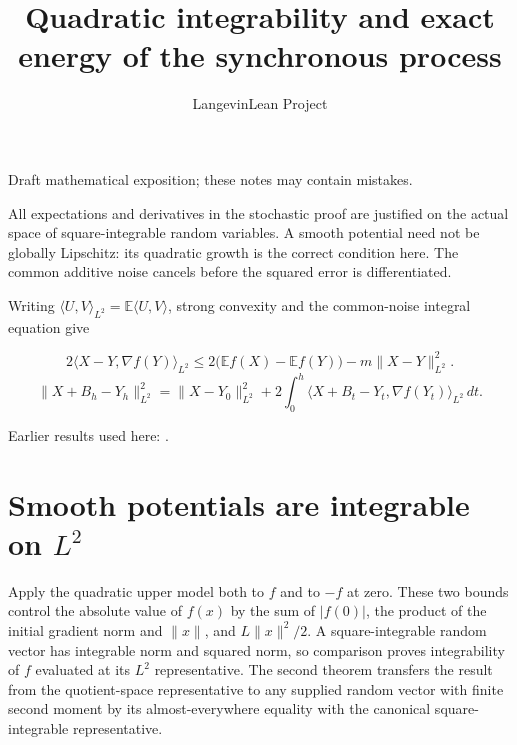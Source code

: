 \documentclass[11pt,a4paper]{article}
\title{\texorpdfstring{Quadratic integrability and exact energy of the synchronous process}{Quadratic integrability and exact energy of the synchronous process}}
\author{LangevinLean Project}
\date{}
\begin{document}
\maketitle
Draft mathematical exposition; these notes may contain mistakes.


All expectations and derivatives in the stochastic proof are justified on the actual space of square-integrable random variables. A smooth potential need not be globally Lipschitz: its quadratic growth is the correct condition here. The common additive noise cancels before the squared error is differentiated.



Writing \(\langle U,V\rangle_{L^2}=\mathbb E\langle U,V\rangle\), strong convexity and the common-noise integral equation give


\[2\langle X-Y,\nabla f(Y)\rangle_{L^2}\le 2\bigl(\mathbb Ef(X)-\mathbb Ef(Y)\bigr)-m\|X-Y\|_{L^2}^{2}.\]
\[\|X+B_h-Y_h\|_{L^2}^{2}=\|X-Y_0\|_{L^2}^{2}+2\int_0^h\langle X+B_t-Y_t,\nabla f(Y_t)\rangle_{L^2}\,dt.\]

Earlier results used here: \cite[Section~3.15]{LangevinLean2026Proximal}.

\section{\texorpdfstring{Smooth potentials are integrable on \(L^{2}\)}{Smooth potentials are integrable on L²}}


Apply the quadratic upper model both to \(f\) and to \(-f\) at zero. These two bounds control the absolute value of \(f(x)\) by the sum of \(|f(0)|\), the product of the initial gradient norm and \(\|x\|\), and \(L\|x\|^{2}/2\). A square-integrable random vector has integrable norm and squared norm, so comparison proves integrability of \(f\) evaluated at its \(L^{2}\) representative. The second theorem transfers the result from the quotient-space representative to any supplied random vector with finite second moment by its almost-everywhere equality with the canonical square-integrable representative.
\end{document}
